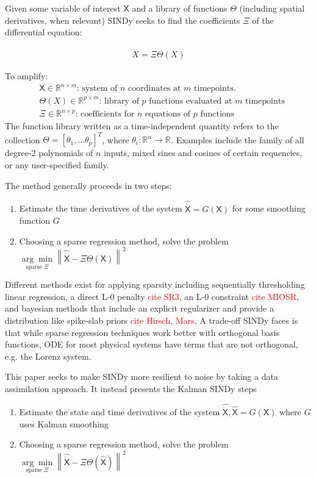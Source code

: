 \documentclass{article}
\newcommand{\red}[1]{\textcolor{red}{#1}}
\newcommand{\mat}[1]{\boldsymbol{\mathsf{#1}}}
\newcommand{\R}[1]{\mathbb{R}^{#1}}
\begin{document}
Given some variable of interest $\mat X$ and a library of functions $\mat \Theta$ (including spatial derivatives, when relevant) SINDy seeks to find the coefficients $\mat \Xi$ of the differential equation:

\begin{align}
    \label{eqn:sindy_ode}
    \dot X = \Xi\Theta(X)
\end{align}

To amplify:
\begin{align*}
    &\mat X \in \R{n \times m}\text{: system of $n$ coordinates at $m$ timepoints.}\\
    &\mat \Theta(X) \in \R{p \times m}\text{: library of $p$ functions evaluated at $m$ timepoints}\\
    &\mat \Xi \in \R{n \times p}\text{: coefficients for $n$ equations of $p$ functions}
\end{align*}
The function library written as a time-independent quantity refers to the collection $\mat \Theta = [\theta_1, \dots \theta_p]^T$, where $\theta_i: \R{n}\rightarrow\R{}$. Examples include the family of all degree-2 polynomials of $n$ inputs, mixed sines and cosines of certain requencies, or any user-specified family.

The method generally proceeds in two steps:

\begin{enumerate}
    \item Estimate the time derivatives of the system ${\mat{\widehat{\dot X}}} = G(\mat X)$ for some smoothing function $G$
    \item Choosing a sparse regression method, solve the problem $\underset{\text{sparse } \mat \Xi}{\arg\min} \left\| \mat{\widehat{\dot{X}}} - \mat \Xi \mat \Theta(\mat X) \right\|^2$
\end{enumerate}
Different methods exist for applying sparsity including sequentially thresholding linear regression, a direct L-0 penalty \red{cite SR3}, an L-0 constraint \red{cite MIOSR}, and bayesian methods that include an explicit regularizer and provide a distribution like spike-slab priors \red{cite Hirsch, Mars}.  A trade-off SINDy faces is that while sparse regression techniques work better with orthogonal basis functions, ODE for most physical systems have terms that are not orthogonal, e.g. the Lorenz system.

This paper seeks to make SINDy more resilient to noise by taking a data assimilation approach.  It instead presents the Kalman SINDy steps
\begin{enumerate}
    \item Estimate the state and time derivatives of the system ${\mat{\widehat{\dot X}}}, \mat{\widehat X} = G(\mat X)$ where $G$ uses Kalman smoothing
    \item Choosing a sparse regression method, solve the problem $\underset{\text{sparse } \mat \Xi}{\arg\min} \left\| \mat{\widehat{\dot{X}}} - \mat \Xi \mat \Theta(\mat {\widehat X}) \right\|^2$
\end{enumerate}
\end{document}
